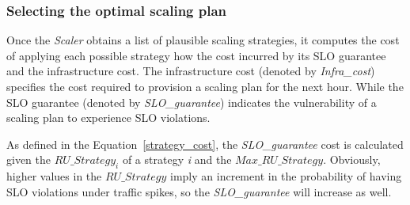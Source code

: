 \subsubsection{Selecting the optimal scaling plan}



Once the \emph{Scaler} obtains a list of plausible scaling strategies, it computes the cost of applying each possible strategy how the cost incurred by its SLO guarantee and the infrastructure cost. The infrastructure cost (denoted by \emph{Infra\_cost}) specifies the cost required to provision a scaling plan for the next hour. While the SLO guarantee (denoted by \emph{SLO\_guarantee}) indicates the vulnerability of a scaling plan to experience SLO violations. 

As defined in the Equation~\ref{strategy_cost}, the \emph{SLO\_guarantee} cost is calculated given the \emph{$RU\_Strategy_{i}$} of a strategy \emph{i} and the \emph{$Max\_RU\_Strategy$}. Obviously, higher values in the \emph{$RU\_Strategy$} imply an increment in the probability of having SLO violations under traffic spikes, so the \emph{SLO\_guarantee} will increase as well. 




